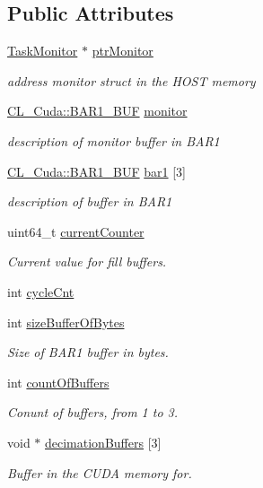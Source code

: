 \subsection*{Public Attributes}
\begin{DoxyCompactItemize}
\item 
\hyperlink{structTaskMonitor}{TaskMonitor} $\ast$ \hyperlink{structTaskData_a2e4a75b578879ae694ecca2a409f26ab}{ptrMonitor}
\begin{DoxyCompactList}\small\item\em address monitor struct in the HOST memory \item\end{DoxyCompactList}\item 
\hyperlink{structCL__Cuda_1_1BAR1__BUF}{CL\_\-Cuda::BAR1\_\-BUF} \hyperlink{structTaskData_a0d4636beee666900987f3ed81e096d09}{monitor}
\begin{DoxyCompactList}\small\item\em description of monitor buffer in BAR1 \item\end{DoxyCompactList}\item 
\hyperlink{structCL__Cuda_1_1BAR1__BUF}{CL\_\-Cuda::BAR1\_\-BUF} \hyperlink{structTaskData_ab7cbd8321c8573a90488c7d1fd843068}{bar1} \mbox{[}3\mbox{]}
\begin{DoxyCompactList}\small\item\em description of buffer in BAR1 \item\end{DoxyCompactList}\item 
uint64\_\-t \hyperlink{structTaskData_ab036e756a3cc0a6570d137a564fc3b85}{currentCounter}
\begin{DoxyCompactList}\small\item\em Current value for fill buffers. \item\end{DoxyCompactList}\item 
int \hyperlink{structTaskData_aa4e4e2414770aff4a16fcb5b0814ddeb}{cycleCnt}
\item 
int \hyperlink{structTaskData_a8981c450153c3f98283391622e26428d}{sizeBufferOfBytes}
\begin{DoxyCompactList}\small\item\em Size of BAR1 buffer in bytes. \item\end{DoxyCompactList}\item 
int \hyperlink{structTaskData_a07b21936ab1d6c2d9f5f69f0b3da4e69}{countOfBuffers}
\begin{DoxyCompactList}\small\item\em Conunt of buffers, from 1 to 3. \item\end{DoxyCompactList}\item 
void $\ast$ \hyperlink{structTaskData_a9b8b05530ea3fea70aebedc097603982}{decimationBuffers} \mbox{[}3\mbox{]}
\begin{DoxyCompactList}\small\item\em Buffer in the CUDA memory for. \item\end{DoxyCompactList}\end{DoxyCompactItemize}


